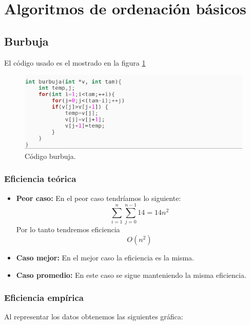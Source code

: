 \section{Algoritmos de ordenación básicos}

\subsection{Burbuja}
El código usado es el mostrado en la figura  \ref{fig1}

\begin{figure}[H]
        \includegraphics[scale=0.7]{imagenes/burbuja.png}
        \caption{Código burbuja.}
        \label{fig1}
\end{figure}

\subsubsection{Eficiencia teórica}

\begin{itemize}
  \item \textbf{Peor caso:} En el peor caso tendríamos lo siguiente:
  \begin{equation}
      \sum_{i=1}^{n}\sum_{j=0}^{n-1}14 = 14 n^2
  \end{equation}
  Por lo tanto tendremos eficiencia \begin{equation} O(n^2) \end{equation}
  
  \item \textbf{Caso mejor:} En el mejor caso la eficiencia es la misma.
  \item \textbf{Caso promedio:} En este caso se sigue manteniendo la misma eficiencia.
\end{itemize}

\subsubsection{Eficiencia empírica}

Al representar los datos obtenemos las siguientes gráfica:

